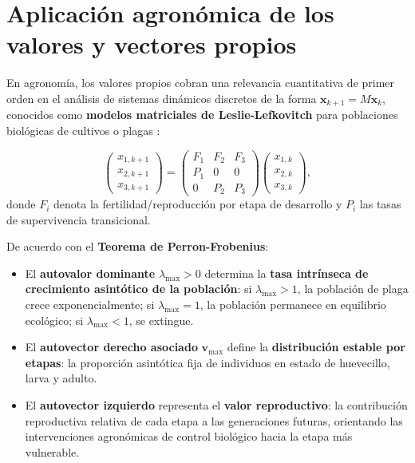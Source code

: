 \documentclass[spanish,letterpaper,oneside]{article}
\begin{document}
\section{Aplicación agronómica de los valores y vectores propios}

En agronomía, los valores propios cobran una relevancia cuantitativa de primer orden en el análisis de sistemas dinámicos discretos de la forma $\mathbf{x}_{k+1} = M \mathbf{x}_k$, conocidos como \textbf{modelos matriciales de Leslie-Lefkovitch} para poblaciones biológicas de cultivos o plagas \citep{leslie1945,caswell2001}:

\begin{equation}
\begin{pmatrix} x_{1, k+1} \\ x_{2, k+1} \\ x_{3, k+1} \end{pmatrix} =
\begin{pmatrix}
F_1 & F_2 & F_3 \\
P_1 & 0 & 0 \\
0 & P_2 & P_3
\end{pmatrix}
\begin{pmatrix} x_{1, k} \\ x_{2, k} \\ x_{3, k} \end{pmatrix},
\end{equation}
donde $F_i$ denota la fertilidad/reproducción por etapa de desarrollo y $P_i$ las tasas de supervivencia transicional.

De acuerdo con el \textbf{Teorema de Perron-Frobenius}:
\begin{itemize}
\item El \textbf{autovalor dominante} $\lambda_{\max} > 0$ determina la \textbf{tasa intrínseca de crecimiento asintótico de la población}: si $\lambda_{\max} > 1$, la población de plaga crece exponencialmente; si $\lambda_{\max} = 1$, la población permanece en equilibrio ecológico; si $\lambda_{\max} < 1$, se extingue.
\item El \textbf{autovector derecho asociado} $\mathbf{v}_{\max}$ define la \textbf{distribución estable por etapas}: la proporción asintótica fija de individuos en estado de huevecillo, larva y adulto.
\item El \textbf{autovector izquierdo} representa el \textbf{valor reproductivo}: la contribución reproductiva relativa de cada etapa a las generaciones futuras, orientando las intervenciones agronómicas de control biológico hacia la etapa más vulnerable.
\end{itemize}
\end{document}
